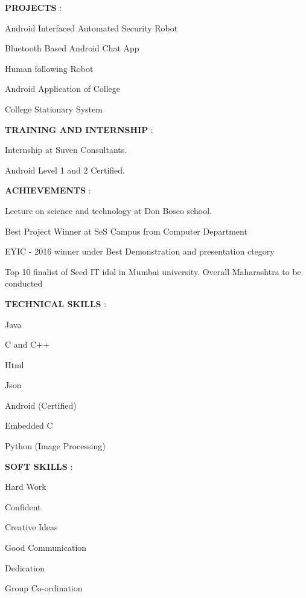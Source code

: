 \documentclass{article}
\begin{document}
 \begin{flushleft}
 \textbf{PROJECTS} :
  \enumerate
  \item Android Interfaced Automated Security Robot
  \item Bluetooth Based Android Chat App
  \item Human following Robot
  \item Android Application of College
  \item College Stationary System
  
 \end{flushleft}

 
 \begin{flushleft}
 \textbf{TRAINING AND INTERNSHIP} :
  \itemize
  \item Internship at Suven Consultants.
  \item Android Level 1 and 2 Certified.
  
 \end{flushleft}
 
 \begin{flushleft}
 \textbf{ACHIEVEMENTS} :
 \enumerate
 \item Lecture on science and technology at Don Bosco school.
 \item Best Project Winner at SeS Campus from Computer Department
 \item EYIC - 2016  winner under Best Demonstration and  presentation ctegory
 \item Top  10 finalist of Seed IT idol in Mumbai university. Overall Maharashtra to be conducted
 
\end{flushleft}


\begin{flushleft}
 \textbf{TECHNICAL SKILLS} :
 \itemize
 \item Java
 \item  C and C++
 \item Html
 \item Json
 \item Android (Certified)
 \item Embedded C
 \item Python (Image Processing)

\end{flushleft}

\begin{flushleft}
 \textbf{SOFT SKILLS} :
 \enumerate
 \item Hard Work
 \item Confident
 \item Creative Ideas
 \item Good Communication
 \item Dedication
 \item Group Co-ordination

 \end{flushleft}
 
\end{document}
